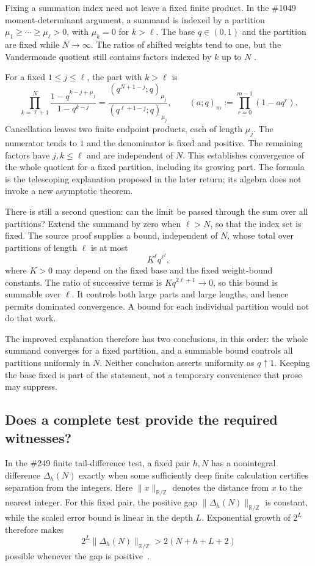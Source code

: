Fixing a summation index need not leave a fixed finite product. In the \#1049
moment-determinant argument, a summand is indexed by a partition
$\mu_1\ge\cdots\ge\mu_\ell>0$, with $\mu_k=0$ for $k>\ell$.
The base $q\in(0,1)$ and the partition are fixed while $N\to\infty$.
The ratios of shifted weights tend to one, but the Vandermonde quotient
still contains factors indexed by $k$ up to $N$
\cite[proof for geometric moment determinants]{paper1049}.

For a fixed $1\le j\le\ell$, the part with $k>\ell$ is
\[
 \prod_{k=\ell+1}^{N}
       \frac{1-q^{k-j+\mu_j}}{1-q^{k-j}}
 =\frac{(q^{N+1-j};q)_{\mu_j}}
        {(q^{\ell+1-j};q)_{\mu_j}},
 \qquad
 (a;q)_m:=\prod_{r=0}^{m-1}(1-aq^r).
\]
Cancellation leaves two finite endpoint products, each of length $\mu_j$.
The numerator tends to $1$ and the denominator is fixed and positive.
The remaining factors have $j,k\le\ell$ and are independent of $N$.
This establishes convergence of the whole quotient for a fixed partition,
including its growing part. The formula is the telescoping explanation
proposed in the later return; its algebra does not invoke a new asymptotic
theorem.

There is still a second question: can the limit be passed through the sum over
all partitions? Extend the summand by zero when $\ell>N$, so that the index set
is fixed. The source proof supplies a bound, independent of $N$, whose total
over partitions of length $\ell$ is at most
\[
                         K^\ell q^{\ell^2},
\]
where $K>0$ may depend on the fixed base and the fixed weight-bound constants.
The ratio of successive terms is $Kq^{2\ell+1}\to0$, so this bound is summable
over $\ell$. It controls both large parts and large lengths, and hence permits
dominated convergence. A bound for each individual partition would not do
that work.

The improved explanation therefore has two conclusions, in this order:
the whole summand converges for a fixed partition, and a summable bound controls
all partitions uniformly in $N$. Neither conclusion asserts uniformity as
$q\uparrow1$. Keeping the base fixed is part of the statement, not a temporary
convenience that prose may suppress.

\subsection{Does a complete test provide the required witnesses?}\label{sec:detection}

In the \#249 finite tail-difference test, a fixed pair $h,N$ has a nonintegral
difference $\Delta_h(N)$ exactly when some sufficiently deep finite calculation
certifies separation from the integers. Here $\|x\|_{\mathbb R/\mathbb Z}$ denotes the distance from $x$ to the nearest
integer. For this fixed pair, the positive gap $\|\Delta_h(N)\|_{\mathbb R/\mathbb Z}$
is constant, while the scaled error
bound is linear in the depth $L$. Exponential growth of $2^L$ therefore makes
\[
       2^L\|\Delta_h(N)\|_{\mathbb R/\mathbb Z}
                 >2(N+h+L+2)
\]
possible whenever the gap is positive~\cite[section on binary totient tails]{paper249}.

